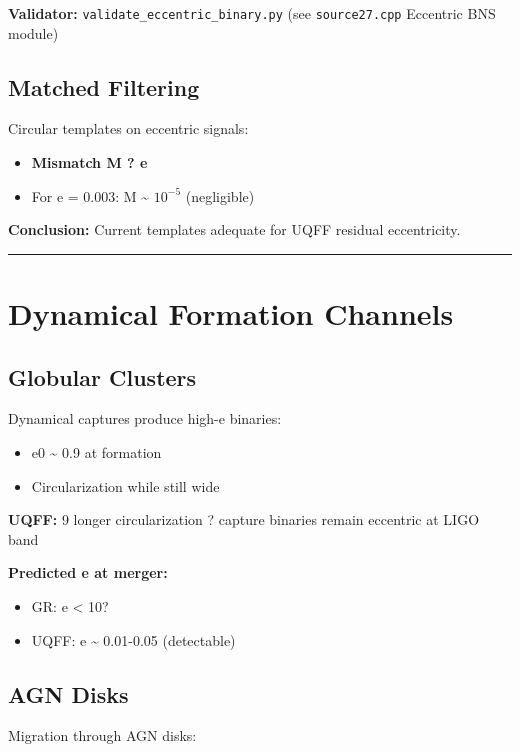 \documentclass[12pt,a4paper]{article}
\begin{document}
\textbf{Validator:} \texttt{validate\_{eccentric\_binary}.py} (see \texttt{source27.cpp} Eccentric BNS module)

\subsection{Matched Filtering}

Circular templates on eccentric signals:

\begin{itemize}
  \item \textbf{Mismatch M ? e}
  \item For e = 0.003: M \textasciitilde{} $10^{-5}$ (negligible)
\end{itemize}

\textbf{Conclusion:} Current templates adequate for UQFF residual eccentricity.

\medskip\hrule\medskip

\section{Dynamical Formation Channels}

\subsection{Globular Clusters}

Dynamical captures produce high-e binaries:

\begin{itemize}
  \item e0 \textasciitilde{} 0.9 at formation
  \item Circularization while still wide
\end{itemize}

\textbf{UQFF:} 9 longer circularization ? capture binaries remain eccentric at LIGO band

\textbf{Predicted e at merger:}

\begin{itemize}
  \item GR: e < 10?
  \item UQFF: e \textasciitilde{} 0.01-0.05 (detectable)
\end{itemize}

\subsection{AGN Disks}

Migration through AGN disks:
\end{document}

